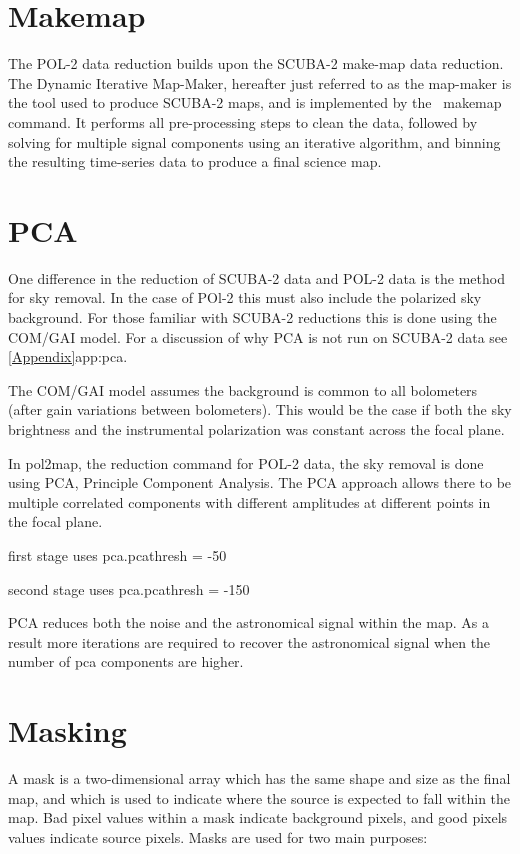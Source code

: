 \section{Makemap}

The POL-2 data reduction builds upon the SCUBA-2 make-map data reduction. The Dynamic Iterative Map-Maker, hereafter just referred to as the map-maker is the tool used to produce SCUBA-2 maps, and is implemented by the \smurf\ makemap command. It performs all pre-processing steps to clean the data, followed by solving for multiple signal components using an iterative algorithm, and binning the resulting time-series data to produce a final science map. 




\section{PCA}

One difference in the reduction of SCUBA-2 data and POL-2 data is the method for sky removal. 
In the case of POl-2 this must also include the polarized sky background. 
For those familiar with SCUBA-2 reductions this is done using the COM/GAI model. 
For a discussion of why PCA is not run on SCUBA-2 data see \cref{Appendix}{app:pca}. 

The COM/GAI model assumes the background is common to all bolometers (after gain variations between bolometers). This would be the case if both the sky brightness and the instrumental polarization was constant across the focal plane. 

In pol2map, the reduction command for POL-2 data, the sky removal is done using PCA, Principle Component Analysis.
The PCA approach allows there to be multiple correlated components with different amplitudes at different points in the focal plane.




first stage uses pca.pcathresh = -50

second stage uses pca.pcathresh = -150


PCA reduces both the noise and the astronomical signal within the map. As a result more iterations are required to recover the astronomical signal when the number of pca components are higher. 



\section{Masking}
A mask is a two-dimensional array which has the same shape and size as the final map, and
which is used to indicate where the source is expected to fall within the map. Bad pixel values
within a mask indicate background pixels, and good pixels values indicate source pixels. Masks
are used for two main purposes:

